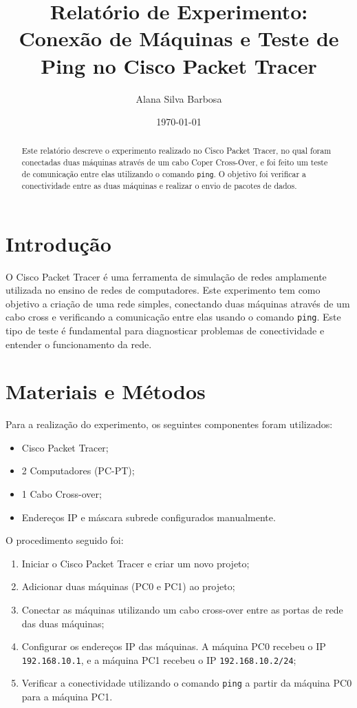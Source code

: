 \documentclass[12pt]{article}
\title{Relatório de Experimento: Conexão de Máquinas e Teste de Ping no Cisco Packet Tracer}
\author{Alana Silva Barbosa}
\date{\today}
\begin{document}
\maketitle

\begin{abstract}
Este relatório descreve o experimento realizado no Cisco Packet Tracer, no qual foram conectadas duas máquinas através de um cabo Coper Cross-Over, e foi feito um teste de comunicação entre elas utilizando o comando \texttt{ping}. O objetivo foi verificar a conectividade entre as duas máquinas e realizar o envio de pacotes de dados.
\end{abstract}

\section{Introdução}

O Cisco Packet Tracer é uma ferramenta de simulação de redes amplamente utilizada no ensino de redes de computadores. Este experimento tem como objetivo a criação de uma rede simples, conectando duas máquinas através de um cabo cross e verificando a comunicação entre elas usando o comando \texttt{ping}. Este tipo de teste é fundamental para diagnosticar problemas de conectividade e entender o funcionamento da rede.

\section{Materiais e Métodos}

Para a realização do experimento, os seguintes componentes foram utilizados:
\begin{itemize}
    \item Cisco Packet Tracer;
    \item 2 Computadores (PC-PT);
    \item 1 Cabo Cross-over;
    \item Endereços IP e máscara subrede configurados manualmente.
\end{itemize}

O procedimento seguido foi:
\begin{enumerate}
    \item Iniciar o Cisco Packet Tracer e criar um novo projeto;
    \item Adicionar duas máquinas (PC0 e PC1) ao projeto;
    \item Conectar as máquinas utilizando um cabo cross-over entre as portas de rede das duas máquinas;
    \item Configurar os endereços IP das máquinas. A máquina PC0 recebeu o IP \texttt{192.168.10.1}, e a máquina PC1 recebeu o IP \texttt{192.168.10.2/24};
    \item Verificar a conectividade utilizando o comando \texttt{ping} a partir da máquina PC0 para a máquina PC1.
\end{enumerate}
\end{document}

